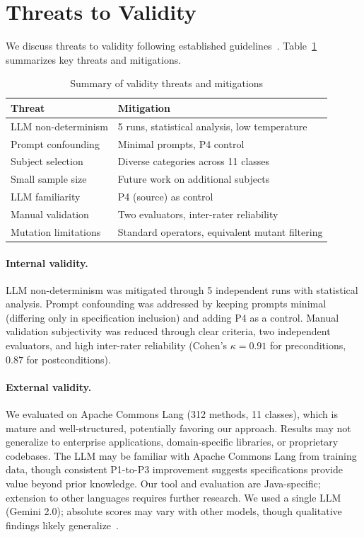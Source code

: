 \section{Threats to Validity}
\label{sec:threats}

We discuss threats to validity following established guidelines~\cite{wohlin2012experimentation}. Table~\ref{tab:threats-summary} summarizes key threats and mitigations.

\begin{table}[ht]
\centering
\caption{Summary of validity threats and mitigations}
\label{tab:threats-summary}
\begin{tabular}{p{2.2cm}p{4.5cm}}
\toprule
\textbf{Threat} & \textbf{Mitigation} \\
\midrule
LLM non-determinism & 5 runs, statistical analysis, low temperature \\
Prompt confounding & Minimal prompts, P4 control \\
Subject selection & Diverse categories across 11 classes \\
Small sample size & Future work on additional subjects \\
LLM familiarity & P4 (source) as control \\
Manual validation & Two evaluators, inter-rater reliability \\
Mutation limitations & Standard operators, equivalent mutant filtering \\
\bottomrule
\end{tabular}
\end{table}

\paragraph{Internal validity.} LLM non-determinism was mitigated through 5 independent runs with statistical analysis. Prompt confounding was addressed by keeping prompts minimal (differing only in specification inclusion) and adding P4 as a control. Manual validation subjectivity was reduced through clear criteria, two independent evaluators, and high inter-rater reliability (Cohen's $\kappa = 0.91$ for preconditions, $0.87$ for postconditions).

\paragraph{External validity.} We evaluated on Apache Commons Lang (312 methods, 11 classes), which is mature and well-structured, potentially favoring our approach. Results may not generalize to enterprise applications, domain-specific libraries, or proprietary codebases. The LLM may be familiar with Apache Commons Lang from training data, though consistent P1-to-P3 improvement suggests specifications provide value beyond prior knowledge. Our tool and evaluation are Java-specific; extension to other languages requires further research. We used a single LLM (Gemini 2.0); absolute scores may vary with other models, though qualitative findings likely generalize~\cite{schafer2023adaptive, yuan2024chatunitest}.

